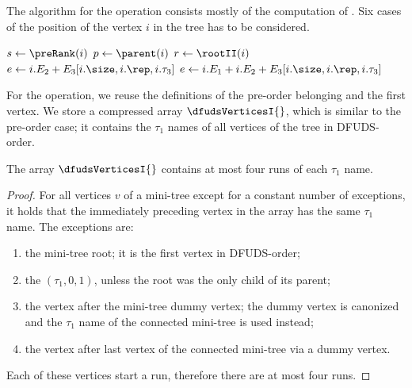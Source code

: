 The algorithm for the operation \dfudsRank{} consists mostly of the computation of \dfudsAnc{}.
Six cases of the position of the vertex $i$ in the tree has to be considered.

\begin{algorithm}
\begin{algorithmic}
		\State {}
		\State {}
	\Else
		\State $s \gets \preRank(i)$
			\State $p \gets \parent(i)$
				\State $r \gets \rootII(i)$
				 
					\State $e \gets i.E_2 + E_3[i.\size, i.\rep, i.\tau_3]$
					\State {}
				\Else {}
					\State $e \gets i.E_1 + i.E_2 + E_3[i.\size, i.\rep, i.\tau_3]$
					\State {}
				\EndIf
			 
				\State {}
			\Else {}
				\State {}
			\EndIf
		 
			\State {}
		\Else {}
			\State {}
		\EndIf
	\EndIf
\EndFunction
\end{algorithmic}
\end{algorithm}

For the \dfudsSelect{} operation, we reuse the definitions of the pre-order belonging and the first vertex.
We store a compressed array $\dfudsVerticesI{}$, which is similar to the pre-order case; it contains the $\tau_1$ names of all vertices of the tree in DFUDS-order.
\begin{lemma}
	The array $\dfudsVerticesI{}$ contains at most four runs of each $\tau_1$ name.
\end{lemma}
\begin{proof}
	For all vertices $v$ of a mini-tree except for a constant number of exceptions, it holds that the immediately preceding vertex in the array has the same $\tau_1$ name.
	The exceptions are:
	\begin{enumerate}
		\item the mini-tree root; it is the first vertex in DFUDS-order;
		\item the $(\tau_1, 0, 1)$, unless the root was the only child of its parent;
		\item the vertex after the mini-tree dummy vertex; the dummy vertex is canonized and the $\tau_1$ name of the connected mini-tree is used instead;
		\item the vertex after last vertex of the connected mini-tree via a dummy vertex.
	\end{enumerate}
	Each of these vertices start a run, therefore there are at most four runs.
\end{proof}

